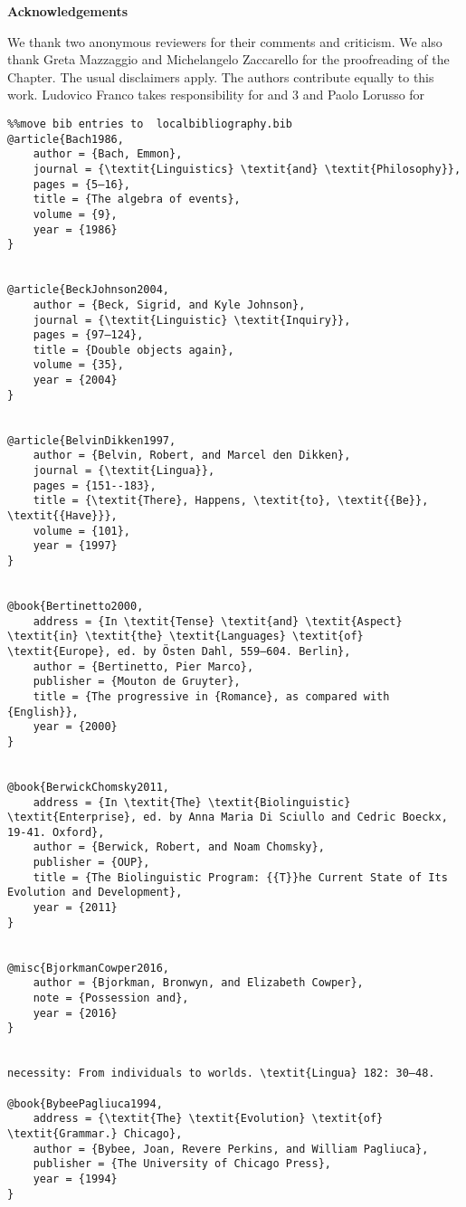 \documentclass[output=paper]{langsci/langscibook}
\begin{document}
\textbf{Acknowledgements}

We thank two anonymous reviewers for their comments and criticism. We also thank Greta Mazzaggio and Michelangelo Zaccarello for the proofreading of the Chapter. The usual disclaimers apply.  The authors contribute equally to this work. Ludovico Franco takes responsibility for  and 3 and Paolo Lorusso for 
\begin{verbatim}%%move bib entries to  localbibliography.bib
@article{Bach1986,
	author = {Bach, Emmon},
	journal = {\textit{Linguistics} \textit{and} \textit{Philosophy}},
	pages = {5–16},
	title = {The algebra of events},
	volume = {9},
	year = {1986}
}


@article{BeckJohnson2004,
	author = {Beck, Sigrid, and Kyle Johnson},
	journal = {\textit{Linguistic} \textit{Inquiry}},
	pages = {97–124},
	title = {Double objects again},
	volume = {35},
	year = {2004}
}


@article{BelvinDikken1997,
	author = {Belvin, Robert, and Marcel den Dikken},
	journal = {\textit{Lingua}},
	pages = {151--183},
	title = {\textit{There}, Happens, \textit{to}, \textit{{Be}}, \textit{{Have}}},
	volume = {101},
	year = {1997}
}


@book{Bertinetto2000,
	address = {In \textit{Tense} \textit{and} \textit{Aspect} \textit{in} \textit{the} \textit{Languages} \textit{of} \textit{Europe}, ed. by Östen Dahl, 559–604. Berlin},
	author = {Bertinetto, Pier Marco},
	publisher = {Mouton de Gruyter},
	title = {The progressive in {Romance}, as compared with {English}},
	year = {2000}
}


@book{BerwickChomsky2011,
	address = {In \textit{The} \textit{Biolinguistic} \textit{Enterprise}, ed. by Anna Maria Di Sciullo and Cedric Boeckx, 19-41. Oxford},
	author = {Berwick, Robert, and Noam Chomsky},
	publisher = {OUP},
	title = {The Biolinguistic Program: {{T}}he Current State of Its Evolution and Development},
	year = {2011}
}


@misc{BjorkmanCowper2016,
	author = {Bjorkman, Bronwyn, and Elizabeth Cowper},
	note = {Possession and},
	year = {2016}
}


necessity: From individuals to worlds. \textit{Lingua} 182: 30–48.

@book{BybeePagliuca1994,
	address = {\textit{The} \textit{Evolution} \textit{of} \textit{Grammar.} Chicago},
	author = {Bybee, Joan, Revere Perkins, and William Pagliuca},
	publisher = {The University of Chicago Press},
	year = {1994}
}



\end{verbatim}
\end{document}
